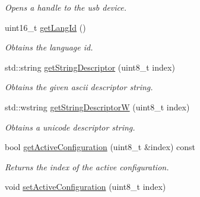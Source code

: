 \begin{DoxyCompactItemize}
\begin{DoxyCompactList}\small\item\em Opens a handle to the usb device. \end{DoxyCompactList}\item 
uint16\-\_\-t \hyperlink{class_lib_u_s_b_1_1_device_impl_a8a7e52a87e4e31e897c76e2c6252a580}{get\-Lang\-Id} ()
\begin{DoxyCompactList}\small\item\em Obtains the language id. \end{DoxyCompactList}\item 
\hypertarget{class_lib_u_s_b_1_1_device_impl_a24069e81e1ea172365da7623e1a6fa43}{std\-::string \hyperlink{class_lib_u_s_b_1_1_device_impl_a24069e81e1ea172365da7623e1a6fa43}{get\-String\-Descriptor} (uint8\-\_\-t index)}\label{class_lib_u_s_b_1_1_device_impl_a24069e81e1ea172365da7623e1a6fa43}

\begin{DoxyCompactList}\small\item\em Obtains the given ascii descriptor string. \end{DoxyCompactList}\item 
\hypertarget{class_lib_u_s_b_1_1_device_impl_ac068f020ebc2ca18d0ba71b1614bbfef}{std\-::wstring \hyperlink{class_lib_u_s_b_1_1_device_impl_ac068f020ebc2ca18d0ba71b1614bbfef}{get\-String\-Descriptor\-W} (uint8\-\_\-t index)}\label{class_lib_u_s_b_1_1_device_impl_ac068f020ebc2ca18d0ba71b1614bbfef}

\begin{DoxyCompactList}\small\item\em Obtains a unicode descriptor string. \end{DoxyCompactList}\item 
\hypertarget{class_lib_u_s_b_1_1_device_impl_af111e332381a0c1483dde061f6d1c7b9}{bool \hyperlink{class_lib_u_s_b_1_1_device_impl_af111e332381a0c1483dde061f6d1c7b9}{get\-Active\-Configuration} (uint8\-\_\-t \&index) const }\label{class_lib_u_s_b_1_1_device_impl_af111e332381a0c1483dde061f6d1c7b9}

\begin{DoxyCompactList}\small\item\em Returns the index of the active configuration. \end{DoxyCompactList}\item 
\hypertarget{class_lib_u_s_b_1_1_device_impl_abeec3c40a76f6faefb2056be8dc8035b}{void \hyperlink{class_lib_u_s_b_1_1_device_impl_abeec3c40a76f6faefb2056be8dc8035b}{set\-Active\-Configuration} (uint8\-\_\-t index)}\label{class_lib_u_s_b_1_1_device_impl_abeec3c40a76f6faefb2056be8dc8035b}


\end{DoxyCompactItemize}

